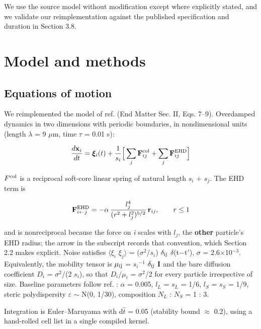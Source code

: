 \documentclass[aps,pre,preprint,superscriptaddress,nofootinbib,longbibliography]{revtex4-2}
\begin{document}
We use the source model without modification except where explicitly stated, and we validate our reimplementation against the published specification and duration in Section 3.8.

\section{Model and methods}

\subsection{Equations of motion}

We reimplemented the model of ref. \cite{r1} (End Matter Sec. II, Eqs. 7--9). Overdamped dynamics in two dimensions with periodic boundaries, in nondimensional units (length $\lambda$ = 9 $\mu$m, time $\tau$ = 0.01 s):

\begin{equation}
\frac{d\mathbf{x}_i}{dt}=\boldsymbol{\xi}_i(t)+\frac{1}{s_i}\Big[\sum_j\mathbf{F}^{\rm col}_{ij}+\sum_j\mathbf{F}^{\rm EHD}_{ij}\Big]
\end{equation}

$F^{\rm col}$ is a reciprocal soft-core linear spring of natural length $s_{i}$ + $s_{j}$. The EHD term is

\begin{equation}
\mathbf{F}^{\rm EHD}_{i\leftarrow j}=-\alpha\,\frac{l_j^{4}}{(r^{2}+l_j^{2})^{5/2}}\,\mathbf{r}_{ij},\qquad r\le 1
\end{equation}

and is nonreciprocal because the force on \emph{i} scales with \emph{$l_{j}$}, the \textbf{other} particle's EHD radius; the arrow in the subscript records that convention, which Section 2.2 makes explicit. Noise satisfies $\langle$$\xi_{i}$ $\xi_{j}$$\rangle$ = ($\sigma ^{2}$/$s_{i}$) $\delta_{\rm ij}$ $\delta$(t$-$t$'$), $\sigma$ = 2.6$\times$10$^{-3}$. Equivalently, the mobility tensor is $\mu_{\rm ij}$ = $s_{i}$$^{-1}$ $\delta_{\rm ij}$ $\mathbf{I}$ and the bare diffusion coefficient $D_{i}$ = $\sigma ^{2}$/(2 $s_{i}$), so that $D_{i}$/$\mu_{i}$ = $\sigma ^{2}$/2 for every particle irrespective of size. Baseline parameters follow ref. \cite{r1}: $\hat{\alpha}$ = 0.005, $l_{L}$ = $s_{L}$ = 1/6, $l_{S}$ = $s_{S}$ = 1/9, steric polydispersity $\varepsilon$ $\sim$ N(0, 1/30), composition $N_{L}$ : $N_{S}$ = 1 : 3.

Integration is Euler--Maruyama with d$\hat{t}$ = 0.05 (stability bound $\approx$ 0.2), using a hand-rolled cell list in a single compiled kernel.
\end{document}
